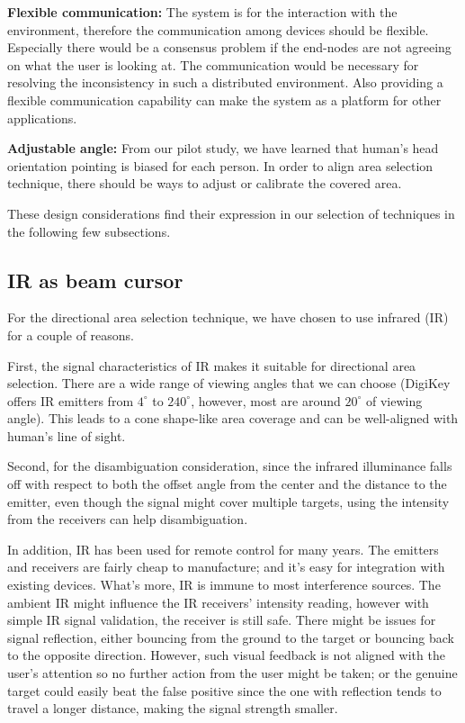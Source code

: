 {\bf Flexible communication:} The system is for the interaction with the environment, therefore the communication among devices should be flexible. Especially there would be a consensus problem if the end-nodes are not agreeing on what the user is looking at. The communication would be necessary for resolving the inconsistency in such a distributed environment. Also providing a flexible communication capability can make the system as a platform for other applications. 

{\bf Adjustable angle:} From our pilot study, we have learned that human's head orientation pointing is biased for each person. In order to align area selection technique, there should be ways to adjust or calibrate the covered area.

These design considerations find their expression in our selection of techniques in the following few subsections.

\subsection{IR as beam cursor}
\label{sec:ir-as-beam}

For the directional area selection technique, we have chosen to use infrared (IR) for a couple of reasons.  

First, the signal characteristics of IR makes it suitable for directional area selection. There are a wide range of viewing angles that we can choose (DigiKey offers IR emitters from $4^\circ$ to $240^\circ$, however, most are around $20^\circ$ of viewing angle). This leads to a cone shape-like area coverage and can be well-aligned with human's line of sight. 

Second, for the disambiguation consideration, since the infrared illuminance falls off with respect to both the offset angle from the center and the distance to the emitter, even though the signal might cover multiple targets, using the intensity from the receivers can help disambiguation.  

In addition, IR has been used for remote control for many years. The emitters and receivers are fairly cheap to manufacture; and it's easy for integration with existing devices. 
What's more, IR is immune to most interference sources. The ambient IR might influence the IR receivers' intensity reading, however with simple IR signal validation, the receiver is still safe. There might be issues for signal reflection, either bouncing from the ground to the target or bouncing back to the opposite direction. However, such visual feedback is not aligned with the user's attention so no further action from the user might be taken; or the genuine target could easily beat the false positive since the one with reflection tends to travel a longer distance, making the signal strength smaller.

